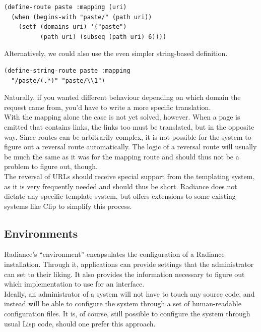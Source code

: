 \documentclass{sig-alternate}
\begin{document}
\begin{verbatim}
(define-route paste :mapping (uri)
  (when (begins-with "paste/" (path uri))
    (setf (domains uri) '("paste")
          (path uri) (subseq (path uri) 6))))
\end{verbatim}

Alternatively, we could also use the even simpler string-based definition.

\begin{verbatim}
(define-string-route paste :mapping
  "/paste/(.*)" "paste/\\1")
\end{verbatim}

Naturally, if you wanted different behaviour depending on which domain the request came from, you'd have to write a more specific translation. \\

With the mapping alone the case is not yet solved, however. When a page is emitted that contains links, the links too must be translated, but in the opposite way. Since routes can be arbitrarily complex, it is not possible for the system to figure out a reversal route automatically. The logic of a reversal route will usually be much the same as it was for the mapping route and should thus not be a problem to figure out, though. \\

The reversal of URLs should receive special support from the templating system, as it is very frequently needed and should thus be short. Radiance does not dictate any specific template system, but offers extensions to some existing systems like Clip\cite{clip} to simplify this process.

\subsection{Environments}
Radiance's ``environment'' encapsulates the configuration of a Radiance installation. Through it, applications can provide settings that the administrator can set to their liking. It also provides the information necessary to figure out which implementation to use for an interface. \\

Ideally, an administrator of a system will not have to touch any source code, and instead will be able to configure the system through a set of human-readable configuration files. It is, of course, still possible to configure the system through usual Lisp code, should one prefer this approach. \\
\end{document}
